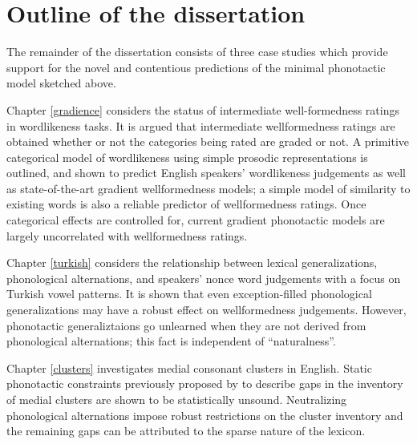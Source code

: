 \section{Outline of the dissertation}

The remainder of the dissertation consists of three case studies which provide support for the novel and contentious predictions of the minimal phonotactic model sketched above.

Chapter \ref{gradience} considers the status of intermediate well-formedness ratings in wordlikeness tasks. 
It is argued that intermediate wellformedness ratings are obtained whether or not the categories being rated are graded or not.
A primitive categorical model of wordlikeness using simple prosodic representations is outlined, and shown to predict English speakers' wordlikeness judgements as well as state-of-the-art gradient wellformedness models; a simple model of similarity to existing words is also a reliable predictor of wellformedness ratings.
Once categorical effects are controlled for, current gradient phonotactic models are largely uncorrelated with wellformedness ratings.

Chapter \ref{turkish} considers the relationship between lexical generalizations, phonological alternations, and speakers' nonce word judgements with a focus on Turkish vowel patterns.
It is shown that even exception-filled phonological generalizations may have a robust effect on wellformedness judgements.
However, phonotactic generaliztaions go unlearned when they are not derived from phonological alternations; this fact is independent of ``naturalness''.

Chapter \ref{clusters} investigates medial consonant clusters in English.
Static phonotactic constraints previously proposed by \citet{Pierrehumbert1994} to describe gaps in the inventory of medial clusters are shown to be statistically unsound.
Neutralizing phonological alternations impose robust restrictions on the cluster inventory and the remaining gaps can be attributed to the sparse nature of the lexicon. 


